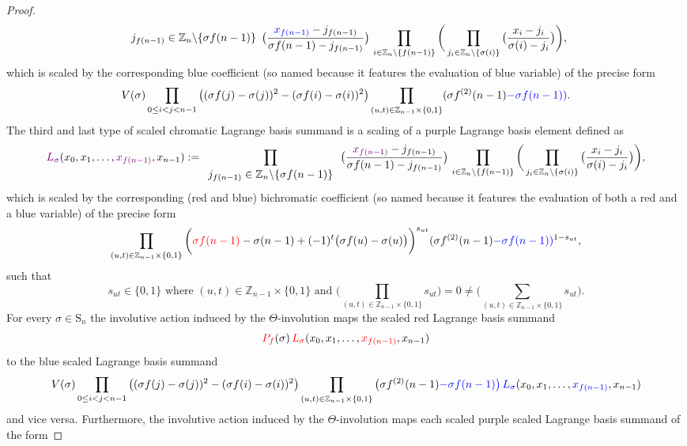 \begin{proof}
\[{\begin{array}{c}
j_{f(n-1)}\in\mathbb{Z}_{n}\backslash\{\sigma f(n-1)\}\end{array}}\big(\frac{{\color{blue}x_{f(n-1)}}-j_{f(n-1)}}{\sigma f(n-1)-j_{f(n-1)}}\big)\,\prod_{i\in\mathbb{Z}_{n}\backslash\{f(n-1)\}}\bigg(\prod_{j_{i}\in\mathbb{Z}_{n}\backslash\{\sigma(i)\}}\big(\frac{x_{i}-j_{i}}{\sigma(i)-j_{i}}\big)\bigg),
\]
which is scaled by the corresponding blue coefficient (so named because it features the evaluation of blue variable) of the precise form
\[
V(\sigma)\prod_{0\le i<j<n-1}\big((\sigma f(j)-\sigma(j))^{2}-(\sigma f(i)-\sigma(i))^{2}\big)\prod_{(u,t)\in\mathbb{Z}_{n-1}\times\{0,1\}}(\sigma f^{(2)}(n-1){\color{blue}-\sigma f(n-1)}{\color{blue})}.
\]
The third and last type of scaled chromatic Lagrange basis summand is a scaling of a purple Lagrange basis element defined as
\[
{\color{violet}L_{\sigma}}(x_{0},x_{1},\ldots,{\color{violet}x_{f(n-1)}},x_{n-1}):=\prod_{\begin{array}{c}
j_{f(n-1)}\in\mathbb{Z}_{n}\backslash\{\sigma f(n-1)\}\end{array}}\big(\frac{{\color{violet}x_{f(n-1)}}-j_{f(n-1)}}{\sigma f(n-1)-j_{f(n-1)}}\big)\,\prod_{i\in\mathbb{Z}_{n}\backslash\{f(n-1)\}}\bigg(\prod_{j_{i}\in\mathbb{Z}_{n}\backslash\{\sigma(i)\}}\big(\frac{x_{i}-j_{i}}{\sigma(i)-j_{i}}\big)\bigg),
\]
which is scaled by the corresponding (red and blue) bichromatic coefficient (so named because it features the evaluation of both a red and a blue variable) of the precise form
\[
\prod_{(u,t)\in\mathbb{Z}_{n-1}\times\{0,1\}}\bigg({\color{red}\sigma f(n-1)}-\sigma(n-1)+(-1)^{t}\big(\sigma f(u)-\sigma(u)\big)\bigg)^{s_{ut}}(\sigma f^{(2)}(n-1){\color{blue}-\sigma f(n-1)}{\color{blue})}^{1-s_{ut}},
\]
such that
\[
s_{ut}\in\{0,1\}\text{ where }(u,t)\in\mathbb{Z}_{n-1}\times\{0,1\}\text{ and }\bigg(\prod_{(u,t)\in\mathbb{Z}_{n-1}\times\{0,1\}}s_{ut}\bigg)=0\ne\bigg(\sum_{(u,t)\in\mathbb{Z}_{n-1}\times\{0,1\}}s_{ut}\bigg).
\]
For every $\sigma\in\text{S}_{n}$ the involutive action induced by the $\Theta$-involution maps the scaled red Lagrange basis summand
\[
{\color{red}P_{f}}(\sigma)\,{\color{red}L_{\sigma}}(x_{0},x_{1},\ldots,{\color{red}x_{f(n-1)}},x_{n-1})
\]
 to the blue scaled Lagrange basis summand
 \[
 V(\sigma)\prod_{0\le i<j<n-1}\big((\sigma f(j)-\sigma(j))^{2}-(\sigma f(i)-\sigma(i))^{2}\big)\prod_{(u,t)\in\mathbb{Z}_{n-1}\times\{0,1\}}\big(\sigma f^{(2)}(n-1){\color{blue}-\sigma f(n-1)}{\color{blue}\big)}\,{\color{blue}L_{\sigma}}(x_{0},x_{1},\ldots,{\color{blue}x_{f(n-1)}},x_{n-1})
 \]
 and vice versa. Furthermore, the involutive action induced by the $\Theta$-involution maps each scaled purple scaled Lagrange basis summand of the form

\end{proof}
